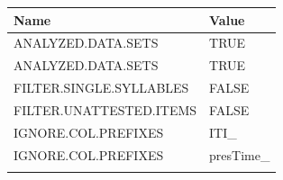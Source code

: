 \documentclass[]{article}
\begin{document}
\begin{longtable}[]{@{}ll@{}}
\toprule
\begin{minipage}[b]{0.03\columnwidth}\raggedright\strut
Name\strut
\end{minipage} & \begin{minipage}[b]{0.92\columnwidth}\raggedright\strut
Value\strut
\end{minipage}\tabularnewline
\midrule
\endhead
\begin{minipage}[t]{0.03\columnwidth}\raggedright\strut
ANALYZED.DATA.SETS\strut
\end{minipage} & \begin{minipage}[t]{0.92\columnwidth}\raggedright\strut
TRUE\strut
\end{minipage}\tabularnewline
\begin{minipage}[t]{0.03\columnwidth}\raggedright\strut
ANALYZED.DATA.SETS\strut
\end{minipage} & \begin{minipage}[t]{0.92\columnwidth}\raggedright\strut
TRUE\strut
\end{minipage}\tabularnewline
\begin{minipage}[t]{0.03\columnwidth}\raggedright\strut
FILTER.SINGLE.SYLLABLES\strut
\end{minipage} & \begin{minipage}[t]{0.92\columnwidth}\raggedright\strut
FALSE\strut
\end{minipage}\tabularnewline
\begin{minipage}[t]{0.03\columnwidth}\raggedright\strut
FILTER.UNATTESTED.ITEMS\strut
\end{minipage} & \begin{minipage}[t]{0.92\columnwidth}\raggedright\strut
FALSE\strut
\end{minipage}\tabularnewline
\begin{minipage}[t]{0.03\columnwidth}\raggedright\strut
IGNORE.COL.PREFIXES\strut
\end{minipage} & \begin{minipage}[t]{0.92\columnwidth}\raggedright\strut
ITI\_\strut
\end{minipage}\tabularnewline
\begin{minipage}[t]{0.03\columnwidth}\raggedright\strut
IGNORE.COL.PREFIXES\strut
\end{minipage} & \begin{minipage}[t]{0.92\columnwidth}\raggedright\strut
presTime\_\strut
\end{minipage}\tabularnewline
\begin{minipage}[t]{0.03\columnwidth}\raggedright\strut

\end{minipage}
\end{longtable}
\end{document}
